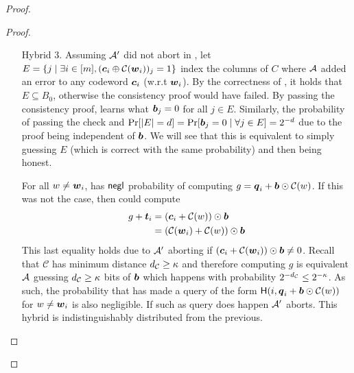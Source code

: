 \begin{proof}
\begin{proof}
\begin{enumerate}[leftmargin=1.8cm]
			
			\item[Hybrid 3.]\label{hybrid:simOutput} Assuming $\mathcal{A}'$ did not abort in , let $E=\{j \mid \exists i\in[m], (\boldsymbol{c}_i\oplus \mathcal{C}(\boldsymbol{w}_i))_j = 1\}$ index the columns of $C$ where $\mathcal{A}$ added an error to any codeword $\boldsymbol{c}_i$ (w.r.t $\boldsymbol{w}_i$). By the correctness of , it holds that $E\subseteq B_0$, otherwise the consistency proof would have failed. By passing the consistency proof, \Adv learns what $\boldsymbol{b}_j=0$ for all $j\in E$. Similarly, the probability of passing the check and $\Pr[|E|=d]=\Pr[\boldsymbol{b}_j=0 \mid \forall j\in E]=2^{-d}$ due to the proof being independent of $\boldsymbol{b}$. We will see that this is equivalent to \Adv simply guessing $E$ (which is correct with the same probability) and then being honest. 
			
			For all $w\neq \boldsymbol{w}_i$, \Adv  has $\mathsf{negl}$ probability of computing $g=\boldsymbol{q}_i+\boldsymbol{b}\odot \mathcal{C}(w)$. If this was not the case, then \Adv  could compute
			\begin{align*}
			g +\boldsymbol{t}_i &=(\boldsymbol{c}_i+\mathcal{C}(w))\odot \boldsymbol{b}\\
			&=(\mathcal{C}(\boldsymbol{w}_i)+\mathcal{C}(w))\odot \boldsymbol{b}
			\end{align*}
			This last equality holds due to $\mathcal{A}'$ aborting if $(\boldsymbol{c}_i+\mathcal{C}(\boldsymbol{w}_i))\odot \boldsymbol{b}\neq 0$. Recall that $\mathcal{C}$ has minimum distance ${d_\mathcal{C}}\geq \kappa$ and therefore computing $g$ is equivalent $\mathcal{A}$ guessing ${d_\mathcal{C}}\geq \kappa$ bits of $\boldsymbol{b}$ which happens with probability $2^{-{d_\mathcal{C}}}\leq 2^{-\kappa}$.  As such, the probability that \Adv has made a query of the form $\mathsf{H}(i,\boldsymbol{q}_i+\boldsymbol{b}\odot \mathcal{C}(w))$ for $w\neq \boldsymbol{w}_i$ is also negligible. If such as query does happen $\mathcal{A}'$ aborts. This hybrid is indistinguishably distributed from the previous. 
			

\end{enumerate}
\end{proof}
\end{proof}

